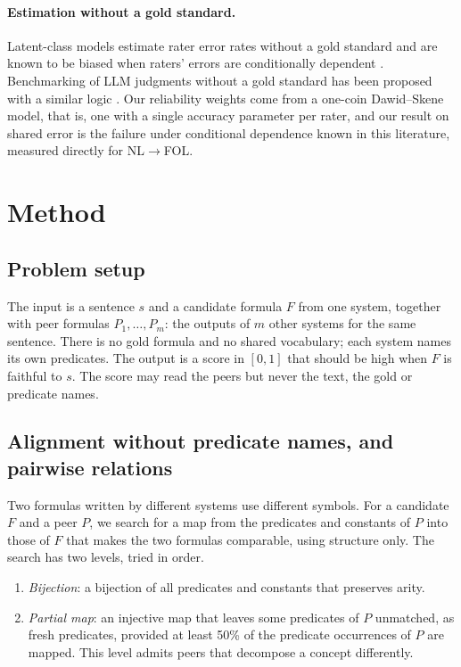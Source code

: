 \documentclass[11pt,letterpaper]{article}
\begin{document}
\paragraph{Estimation without a gold standard.} Latent-class models estimate rater error rates without a gold standard \citep{Dawid1979,Hui1980} and are known to be biased when raters' errors are conditionally dependent \citep{Albert2004}. Benchmarking of LLM judgments without a gold standard has been proposed with a similar logic \citep{Xu2024}. Our reliability weights come from a one-coin Dawid--Skene model, that is, one with a single accuracy parameter per rater, and our result on shared error is the failure under conditional dependence known in this literature, measured directly for NL$\rightarrow$FOL.

\section{Method}
\label{sec:method}

\subsection{Problem setup}

The input is a sentence $s$ and a candidate formula $F$ from one system, together with peer formulas $P_1, \dots, P_m$: the outputs of $m$ other systems for the same sentence. There is no gold formula and no shared vocabulary; each system names its own predicates. The output is a score in $[0, 1]$ that should be high when $F$ is faithful to $s$. The score may read the peers but never the text, the gold or predicate names.

\subsection{Alignment without predicate names, and pairwise relations}

Two formulas written by different systems use different symbols. For a candidate $F$ and a peer $P$, we search for a map from the predicates and constants of $P$ into those of $F$ that makes the two formulas comparable, using structure only. The search has two levels, tried in order.
\begin{enumerate}
  \item \emph{Bijection}: a bijection of all predicates and constants that preserves arity.
  \item \emph{Partial map}: an injective map that leaves some predicates of $P$ unmatched, as fresh predicates, provided at least 50\% of the predicate occurrences of $P$ are mapped. This level admits peers that decompose a concept differently.
\end{enumerate}
\end{document}
